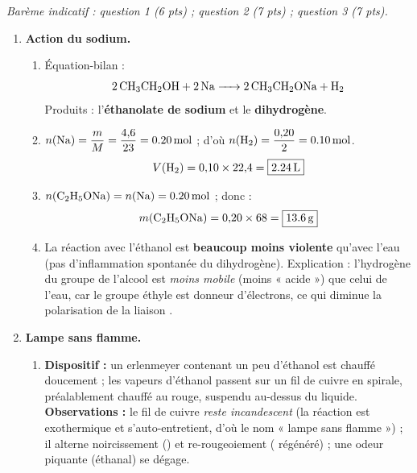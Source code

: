 \documentclass[11pt]{article}
\begin{document}
\begin{corrige}
\emph{Barème indicatif : question 1 (6 pts) ; question 2 (7 pts) ; question 3 (7 pts).}

\begin{enumerate}
\item \textbf{Action du sodium.}
\begin{enumerate}
\item Équation-bilan :
\[ \ce{2 CH3CH2OH + 2 Na -> 2 CH3CH2ONa + H2} \]
Produits : l'\textbf{éthanolate de sodium} et le \textbf{dihydrogène}.
\item $n(\ce{Na}) = \dfrac{m}{M} = \dfrac{4{,}6}{23} = \SI{0,20}{mol}$ ; d'où $n(\ce{H2}) = \dfrac{0{,}20}{2} = \SI{0,10}{mol}$.
\[ V(\ce{H2}) = 0{,}10 \times 22{,}4 = \boxed{\SI{2,24}{L}} \]
\item $n(\ce{C2H5ONa}) = n(\ce{Na}) = \SI{0,20}{mol}$ ; donc :
\[ m(\ce{C2H5ONa}) = 0{,}20 \times 68 = \boxed{\SI{13,6}{g}} \]
\item La réaction avec l'éthanol est \textbf{beaucoup moins violente} qu'avec l'eau (pas d'inflammation spontanée du dihydrogène). Explication : l'hydrogène du groupe  de l'alcool est \emph{moins mobile} (moins « acide ») que celui de l'eau, car le groupe éthyle  est donneur d'électrons, ce qui diminue la polarisation de la liaison .
\end{enumerate}
\item \textbf{Lampe sans flamme.}
\begin{enumerate}
\item \textbf{Dispositif :} un erlenmeyer contenant un peu d'éthanol est chauffé doucement ; les vapeurs d'éthanol passent sur un fil de cuivre en spirale, préalablement chauffé au rouge, suspendu au-dessus du liquide. \textbf{Observations :} le fil de cuivre \emph{reste incandescent} (la réaction est exothermique et s'auto-entretient, d'où le nom « lampe sans flamme ») ; il alterne noircissement () et re-rougeoiement ( régénéré) ; une odeur piquante (éthanal) se dégage.
\begin{popfigure}
\end{popfigure}
\end{enumerate}
\end{enumerate}
\end{corrige}
\end{document}
